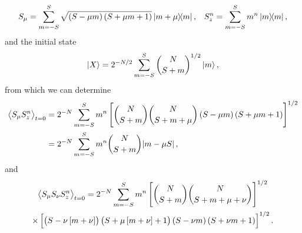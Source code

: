 \documentclass[aps,notitlepage,nofootinbib,11pt]{revtex4-1}
\newcommand{\p}[1]{\left(#1\right)} %
\renewcommand{\sp}[1]{\left[#1\right]} %
\newcommand{\bk}{\Braket} %
\newcommand{\1}{\mathds{1}}
\begin{document}
\begin{align}
  S_\mu = \sum_{m=-S}^S \sqrt{\p{S-\mu m}\p{S+\mu m+1}} \op{m+\mu}{m},
  &&
  S_z^n = \sum_{m=-S}^S m^n \op{m},
\end{align}
and the initial state
\begin{align}
  \ket{X} = 2^{-N/2} \sum_{m=-S}^S { N \choose S+m }^{1/2} \ket{m},
\end{align}
from which we can determine
\begin{align}
  \bk{S_\mu S_z^n}_{t=0}
  &= 2^{-N} \sum_{m=-S}^S m^n
  \sp{{ N \choose S+m } { N \choose S+m+\mu }
    \p{S-\mu m}\p{S+\mu m+1}}^{1/2} \\
  &= 2^{-N} \sum_{m=-S}^S m^n { N \choose S+m } \abs{m - \mu S},
\end{align}
and
\begin{multline}
  \bk{S_\mu S_\nu S_z^n}_{t=0}
  = 2^{-N} \sum_{m=-S}^S m^n
  \sp{{ N \choose S+m } { N \choose S+m+\mu+\nu }}^{1/2} \\
  \times \sp{\p{S-\nu\sp{m+\nu}}\p{S+\mu\sp{m+\nu}+1}
    \p{S-\nu m}\p{S+\nu m+1}}^{1/2}.
\end{multline}


\end{document}

